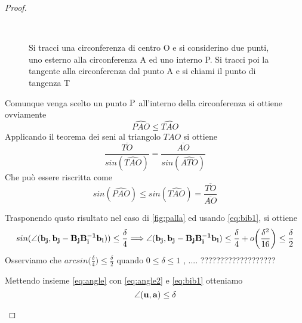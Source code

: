 \documentclass[a4paper,11pt,openright,twoside	]{book}
\begin{document}
\begin{proof}
\begin{itemize}
\begin{figure}[h!]
\centering\
\caption{Si tracci una circonferenza di centro O e si considerino due punti, uno esterno alla circonferenza A ed uno interno P. Si tracci poi la tangente alla circonferenza dal punto A e si chiami il punto di tangenza T}
\label{fig:triangolo3}
\end{figure}


Comunque venga scelto un punto $ \rm P$ all'interno della circonferenza si ottiene ovviamente \\
\[ \widehat{PAO} \leq \widehat{TAO} \]
Applicando il teorema dei seni al triangolo $TAO$  si ottiene
\[ \frac{\overline{TO}}{sin( \widehat{TAO}) } = \frac{\overline{AO}}{sin( \widehat{ATO}) } \]
Che può essere riscritta come 
\begin{equation}
\label{eq:seni}
sin(\widehat{PAO}) \leq sin( \widehat{TAO})= \frac{\overline{TO}}{\overline{AO}}
\end{equation}

Trasponendo qusto risultato nel caso di \ref{fig:palla} ed usando \ref{eq:bib1}, si ottiene 
\begin{equation}
\label{eq:angle2}
sin(\angle(\vb{b_j}, \vb{b_j- B_j B_i^{-1} b_i} ) ) \leq \frac{\delta}{4}
\Longrightarrow \angle(\vb{b_j}, \vb{b_j- B_j B_i^{-1} b_i} ) \leq \frac{\delta}{4} + o \bigg( \frac{\delta^2}{16} \bigg) \leq \frac{\delta}{2}
\end{equation}
Osserviamo che $arcsin \bigg( \frac{\delta}{4} \bigg) \leq \frac{\delta}{2}$ 
quando $0 \leq \delta \leq 1$ , .... ???????????????????

Mettendo insieme \ref{eq:angle} con \ref{eq:angle2} e \ref{eq:bib1} otteniamo
\[ \angle (\vb{u, a}) \leq \delta \]
\end{itemize}


\end{proof}
\end{document}
